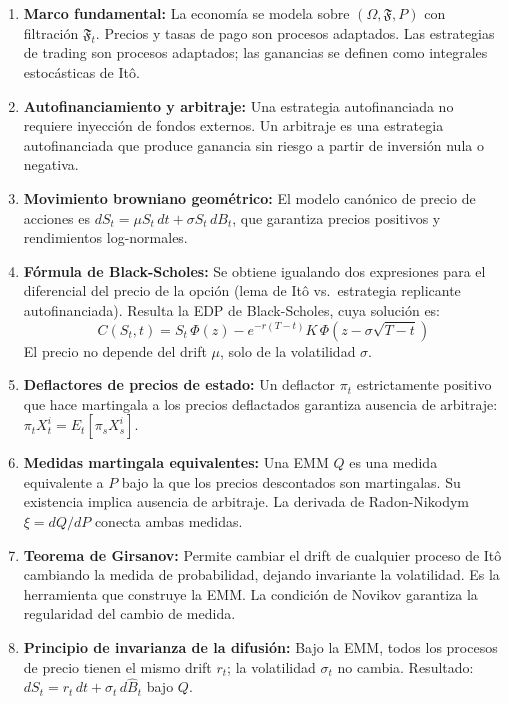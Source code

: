 \documentclass[12pt]{article}
\begin{document}
\begin{enumerate}
  \item \textbf{Marco fundamental:} La econom\'ia se modela sobre $(\Omega, \mathfrak{F}, P)$ con filtraci\'on $\mathfrak{F}_t$. Precios y tasas de pago son procesos adaptados. Las estrategias de trading son procesos adaptados; las ganancias se definen como integrales estoc\'asticas de It\^o.

  \item \textbf{Autofinanciamiento y arbitraje:} Una estrategia autofinanciada no requiere inyecci\'on de fondos externos. Un arbitraje es una estrategia autofinanciada que produce ganancia sin riesgo a partir de inversi\'on nula o negativa.

  \item \textbf{Movimiento browniano geom\'etrico:} El modelo can\'onico de precio de acciones es $dS_t = \mu S_t\,dt + \sigma S_t\,dB_t$, que garantiza precios positivos y rendimientos log-normales.

  \item \textbf{F\'ormula de Black-Scholes:} Se obtiene igualando dos expresiones para el diferencial del precio de la opci\'on (lema de It\^o vs.\ estrategia replicante autofinanciada). Resulta la EDP de Black-Scholes, cuya soluci\'on es:
  \[
    C(S_t, t) = S_t\,\Phi(z) - e^{-r(T-t)} K\,\Phi\!\left(z - \sigma\sqrt{T-t}\right)
  \]
  El precio no depende del drift $\mu$, solo de la volatilidad $\sigma$.

  \item \textbf{Deflactores de precios de estado:} Un deflactor $\pi_t$ estrictamente positivo que hace martingala a los precios deflactados garantiza ausencia de arbitraje: $\pi_t X_t^i = E_t[\pi_s X_s^i]$.

  \item \textbf{Medidas martingala equivalentes:} Una EMM $Q$ es una medida equivalente a $P$ bajo la que los precios descontados son martingalas. Su existencia implica ausencia de arbitraje. La derivada de Radon-Nikodym $\xi = dQ/dP$ conecta ambas medidas.

  \item \textbf{Teorema de Girsanov:} Permite cambiar el drift de cualquier proceso de It\^o cambiando la medida de probabilidad, dejando invariante la volatilidad. Es la herramienta que construye la EMM. La condici\'on de Novikov garantiza la regularidad del cambio de medida.

  \item \textbf{Principio de invarianza de la difusi\'on:} Bajo la EMM, todos los procesos de precio tienen el mismo drift $r_t$; la volatilidad $\sigma_t$ no cambia. Resultado: $dS_t = r_t\,dt + \sigma_t\,d\hat{B}_t$ bajo $Q$.


\end{enumerate}
\end{document}
